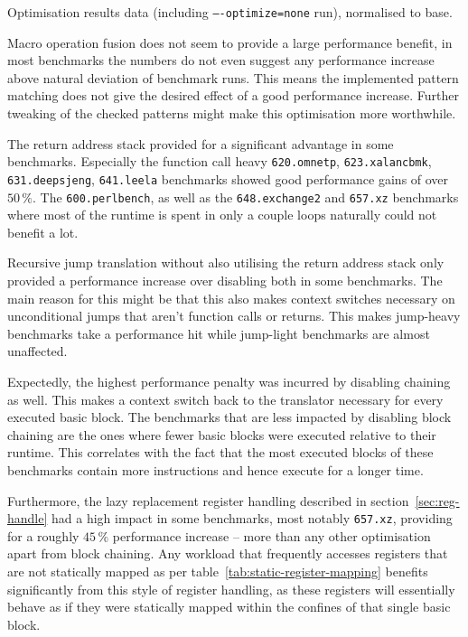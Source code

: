 \begin{table}[h]
\centering
\pgfplotstabletypeset[columns/Benchmark/.style={string type},/pgf/number format/fixed, /pgf/number format/precision = 2,/pgf/number format/fixed zerofill=true]{\printtable}
\caption[Optimisation results]{Optimisation results data (including \texttt{----optimize=none} run), normalised to base.}
\label{tab:table-optim}
\end{table}


Macro operation fusion does not seem to provide a large performance benefit, in most benchmarks the numbers do not even suggest any performance increase above natural deviation of benchmark runs.
This means the implemented pattern matching does not give the desired effect of a good performance increase.
Further tweaking of the checked patterns might make this optimisation more worthwhile.

The return address stack provided for a significant advantage in some benchmarks.
Especially the function call heavy \texttt{620.omnetp}, \texttt{623.xalancbmk}, \texttt{631.deepsjeng}, \texttt{641.leela} benchmarks showed good performance gains of over $50\,\%$.
The \texttt{600.perlbench}, as well as the \texttt{648.exchange2} and \texttt{657.xz} benchmarks where most of the runtime is spent in only a couple loops naturally could not benefit a lot.

Recursive jump translation without also utilising the return address stack only provided a performance increase over disabling both in some benchmarks.
The main reason for this might be that this also makes context switches necessary on unconditional jumps that aren't function calls or returns.
This makes jump-heavy benchmarks take a performance hit while jump-light benchmarks are almost unaffected.

Expectedly, the highest performance penalty was incurred by disabling chaining as well.
This makes a context switch back to the translator necessary for every executed basic block.
The benchmarks that are less impacted by disabling block chaining are the ones where fewer basic blocks were executed relative to their runtime.
This correlates with the fact that the most executed blocks of these benchmarks contain more instructions and hence execute for a longer time.

Furthermore, the lazy replacement register handling described in section~\ref{sec:reg-handle} had a high impact in some benchmarks, most notably \texttt{657.xz}, providing for a roughly $45\,\%$ performance increase -- more than any other optimisation apart from block chaining.
Any workload that frequently accesses registers that are not statically mapped as per table~\vref{tab:static-register-mapping} benefits significantly from this style of register handling, as these registers will essentially behave as if they were statically mapped within the confines of that single basic block.

